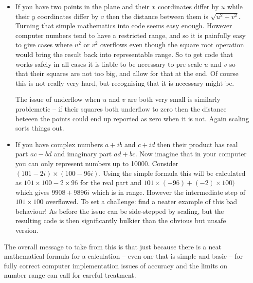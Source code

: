 \begin{itemize}
\item[Hypotenuse]
If you have two points in the plane and their $x$ coordinates differ by $u$
while their $y$ coordinates differ by $v$ then the distance between them is
$\sqrt{u^2 + v^2}$. Turning that simple mathematics into code seems
easy enough. However computer numbers tend to have a restricted range, and
so it is painfully easy to give cases where $u^2$ or $v^2$ overflows even
though the square root operation would bring the result back into
representable range. So to get code that works safely in all cases it
is liable to be necessary to pre-scale $u$ and $v$ so that their squares are
not too big, and allow for that at the end. Of course this is not really
very hard, but recognising that it is necessary might be.

The issue of underflow when $u$ and $v$ are both very small is similarly
problemetic -- if their squares both underflow to zero then the distance
beteeen the points could end up reported as zero when it is not. Again
scaling sorts things out.

\item[Complex multiplication]
If you have complex numbers $a + i b$ and $c + i d$ then their
product has real part $a c - b d$ and imaginary part $a d + b c$. Now
imagine that in your computer you can only represent numbers up to
10000. Consider $(101 - 2 i) \times (100 - 96 i)$. Using the
simple formula this  will be calculated as $101 \times 100 - 2 \times 96$
for the real part and $101 \times (-96) +  (-2) \times 100)$
which gives $9908 + 9896 i$ which is in range. However the intermediate
step of $101 \times 100$ overflowed. To set a challenge: find a neater
example of this bad behaviour! As before the issue can be side-stepped
by scaling, but the resulting code is then significantly bulkier than
the obvious but unsafe version.
\end{itemize}

The overall message to take from this is that just because there is a neat
mathematical formula for a calculation -- even one that is simple and
basic -- for fully correct computer implementation issues of accuracy
and the limits on number range can call for careful treatment. 